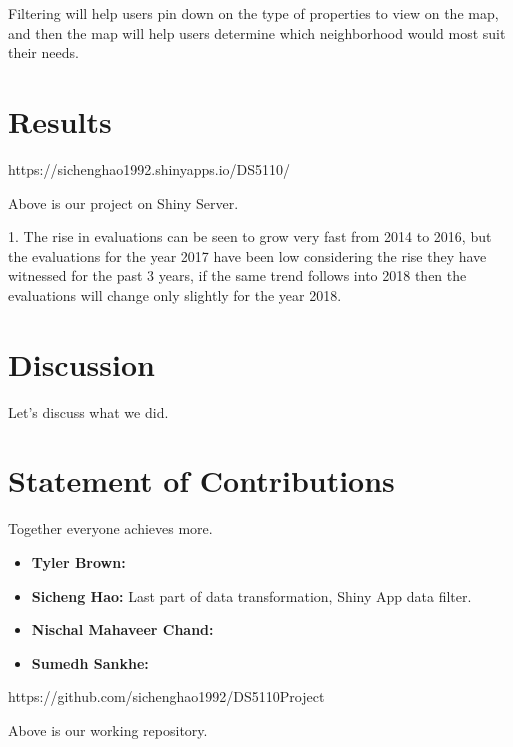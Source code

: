 \documentclass[12pt]{article}
\begin{document}
Filtering will help users pin down on the type of properties to view on
the map, and then the map will help users determine which neighborhood
would most suit their needs.

\section*{Results}

https://sichenghao1992.shinyapps.io/DS5110/

Above is our project on Shiny Server. 


1. The rise in evaluations can be seen to grow very fast from 2014 to 2016, but the 
evaluations for the year 2017 have been low considering the rise they have witnessed 
for the past 3 years, if the same trend follows into 2018 then the evaluations will change 
only slightly for the year 2018.

\section*{Discussion}

Let's discuss what we did.

\section*{Statement of Contributions}

Together everyone achieves more.

\begin{itemize}
\item \textbf{Tyler Brown:}
\item \textbf{Sicheng Hao:} Last part of data transformation, Shiny App data filter.
\item \textbf{Nischal Mahaveer Chand:}
\item \textbf{Sumedh Sankhe:}
\end{itemize}

 


\begin{appendices}

https://github.com/sichenghao1992/DS5110Project

Above is our working repository.

\end{appendices}
\end{document}
